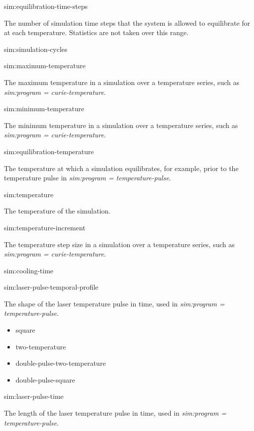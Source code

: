 {\zicf sim:equilibration-time-steps} The number of simulation time steps that the system is allowed to equilibrate for at each temperature. Statistics are not taken over this range.

{\zicf sim:simulation-cycles}

{\zicf sim:maximum-temperature} The maximum temperature in a simulation over a temperature series, such as \textit{sim:program = curie-temperature}.

{\zicf sim:minimum-temperature} The minimum temperature in a simulation over a temperature series, such as \textit{sim:program = curie-temperature}.

{\zicf sim:equilibration-temperature} The temperature at which a simulation equilibrates, for example, prior to the temperature pulse in \textit{sim:program = temperature-pulse}.

{\zicf sim:temperature} The temperature of the simulation.

{\zicf sim:temperature-increment} The temperature step size in a simulation over a temperature series, such as \textit{sim:program = curie-temperature}.

{\zicf sim:cooling-time}

{\zicf sim:laser-pulse-temporal-profile} The shape of the laser temperature pulse in time, used in \textit{sim:program = temperature-pulse}.

\begin{itemize}
   \item[] square
   \item[] two-temperature
   \item[] double-pulse-two-temperature
   \item[] double-pulse-square
\end{itemize}

{\zicf sim:laser-pulse-time} The length of the laser temperature pulse in time, used in \textit{sim:program = temperature-pulse}.

